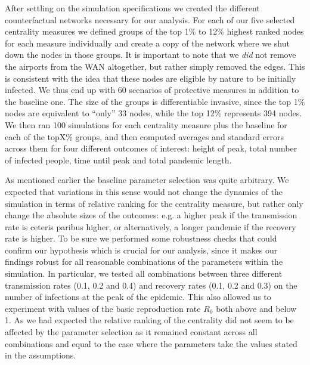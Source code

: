 \documentclass{Template_resources/netsci-project}
\begin{document}
After settling on the simulation specifications we created the different counterfactual networks necessary for our analysis. For each of our five selected centrality measures we defined groups of the top 1\% to 12\% highest ranked nodes for each measure individually and create a copy of the network where we shut down the nodes in those groups. It is important to note that we \emph{did} not remove the airports from the WAN altogether, but rather simply removed the edges. This is consistent with the idea that these nodes are eligible by nature to be initially infected. We thus end up with 60 scenarios of protective measures in addition to the baseline one. The size of the groups is differentiable invasive, since the top 1\% nodes are equivalent to ``only'' 33 nodes, while the top 12\% represents 394 nodes. We then ran 100 simulations for each centrality measure plus the baseline for each of the topX\% groups, and then computed averages and standard errors across them for four different outcomes of interest: height of peak, total number of infected people, time until peak and total pandemic length. 

As mentioned earlier the baseline parameter selection was quite arbitrary. We expected that variations in this sense would not change the dynamics of the simulation in terms of relative ranking for the centrality measure, but rather only change the absolute sizes of the outcomes: e.g. a higher peak if the transmission rate is ceteris paribus higher, or alternatively, a longer pandemic if the recovery rate is higher. To be sure we performed some robustness checks that could confirm our hypothesis which is crucial for our analysis, since it makes our findings robust for all reasonable combinations of the parameters within the simulation. In particular, we tested all combinations between three different transmission rates (0.1, 0.2 and 0.4) and recovery rates (0.1, 0.2 and 0.3) on the number of infections at the peak of the epidemic. This also allowed us to experiment with values of the basic reproduction rate $R_0$ both above and below 1. As we had expected the relative ranking of the centrality did not seem to be affected by the parameter selection as it remained constant across all combinations and equal to the case where the parameters take the values stated in the assumptions.


\end{document}
